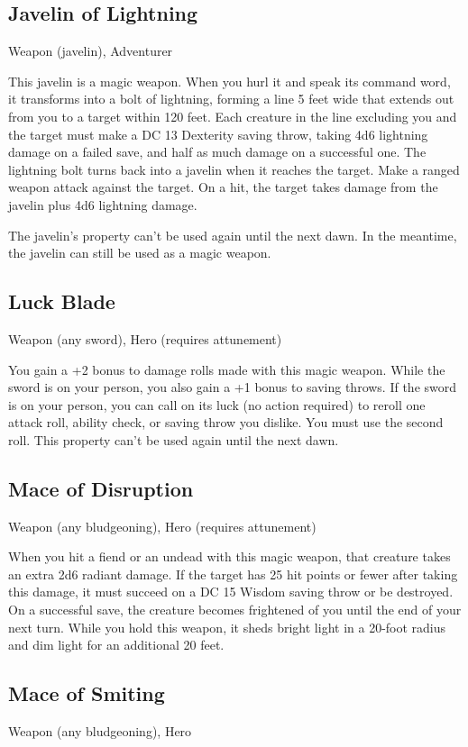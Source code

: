 \subsection{Javelin of Lightning}
Weapon (javelin), Adventurer

This javelin is a magic weapon. When you hurl it and speak its command word, it transforms into a bolt of lightning, forming a line 5 feet wide that extends out from you to a target within 120 feet. Each creature in the line excluding you and the target must make a DC 13 Dexterity saving throw, taking 4d6 lightning damage on a failed save, and half as much damage on a successful one. The lightning bolt turns back into a javelin when it reaches the target. Make a ranged weapon attack against the target. On a hit, the target takes damage from the javelin plus 4d6 lightning damage.

The javelin's property can't be used again until the next dawn. In the meantime, the javelin can still be used as a magic weapon.

\subsection{Luck Blade}
Weapon (any sword), Hero (requires attunement) 

You gain a +2 bonus to damage rolls made with this magic weapon. While the sword is on your person, you also gain a +1 bonus to saving throws. If the sword is on your person, you can call on its luck (no action required) to reroll one attack roll, ability check, or saving throw you dislike. You must use the second roll. This property can't be used again until the next dawn.

\subsection{Mace of Disruption}
Weapon (any bludgeoning), Hero (requires attunement) 

When you hit a fiend or an undead with this magic weapon, that creature takes an extra 2d6 radiant damage. If the target has 25 hit points or fewer after taking this damage, it must succeed on a DC 15 Wisdom saving throw or be destroyed. On a successful save, the creature becomes frightened of you until the end of your next turn.  While you hold this weapon, it sheds bright light in a 20-foot radius and dim light for an additional 20 feet.

\subsection{Mace of Smiting}
Weapon (any bludgeoning), Hero 

